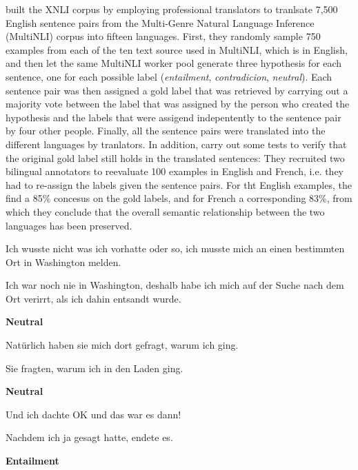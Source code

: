 \cite{conneau2018xnli} built the XNLI corpus by employing professional translators to tranlsate
7,500 English sentence pairs from the Multi-Genre Natural Language Inference (MultiNLI) corpus
\cite{williams2017broad} into fifteen languages.
First, they randomly sample 750 examples from each of the ten text source used in MultiNLI, which
is in English, and then let the same MultiNLI worker pool generate three hypothesis for each
sentence, one for each possible label (\emph{entailment}, \emph{contradicion}, \emph{neutral}).
Each sentence pair was then assigned a gold label that was retrieved by carrying out a majority
vote between the label that was assigned by the person who created the hypothesis and the labels
that were assigend indepentently to the sentence pair by four other people.
Finally, all the sentence pairs were translated into the different languages by tranlators.
In addition, \cite{conneau2018xnli} carry out some tests to verify that the original gold label
still holds in the translated sentences:
They recruited two bilingual annotators to reevaluate 100 examples in English and French, i.e.
they had to re-assign the labels given the sentence pairs.
For tht English examples, the find a 85\% concesus on the gold labels, and for French a
corresponding 83\%, from which they conclude that the overall semantic relationship between the
two languages has been preserved.


\begin{examples}
  \label{ex:xnli}
  \item Ich wusste nicht was ich vorhatte oder so, ich musste mich an einen bestimmten Ort in Washington melden.

        Ich war noch nie in Washington, deshalb habe ich mich auf der Suche nach dem Ort verirrt, als ich dahin entsandt wurde.

  \textbf{Neutral}
\end{examples}

\begin{examples}
  \item Natürlich haben sie mich dort gefragt, warum ich ging.

        Sie fragten, warum ich in den Laden ging.

  \textbf{Neutral}
\end{examples}

\begin{examples}
  \item Und ich dachte OK und das war es dann!

        Nachdem ich ja gesagt hatte, endete es.

  \textbf{Entailment}
\end{examples}

